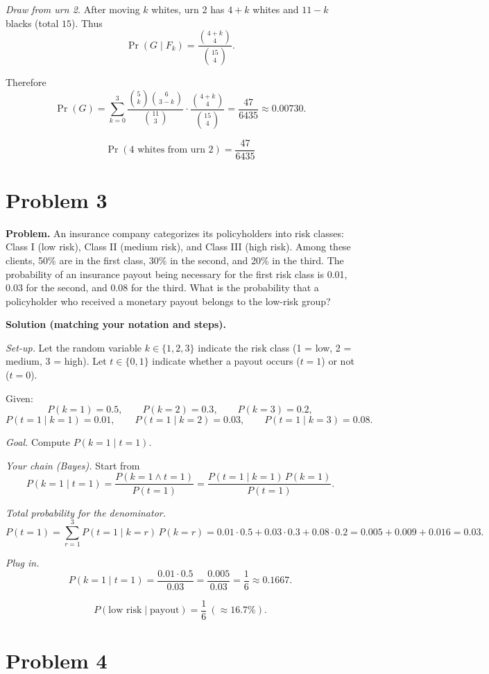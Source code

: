 \documentclass{article}
\begin{document}
\textit{Draw from urn 2.} After moving $k$ whites, urn 2 has $4+k$ whites and $11-k$ blacks
(total $15$). Thus
\[
\Pr(G\mid F_k)=\frac{\binom{4+k}{4}}{\binom{15}{4}}.
\]

Therefore
\[
\Pr(G)=\sum_{k=0}^{3}\frac{\binom{5}{k}\binom{6}{3-k}}{\binom{11}{3}}
\cdot \frac{\binom{4+k}{4}}{\binom{15}{4}}
= \frac{47}{6435}\approx 0.00730.
\]

\[
\boxed{\Pr(\text{4 whites from urn 2})=\dfrac{47}{6435}}
\]

\section{Problem 3}

\textbf{Problem.} An insurance company categorizes its policyholders into risk classes: Class I (low risk), Class II (medium risk), and Class III (high risk). Among these clients, 50\% are in the first class, 30\% in the second, and 20\% in the third. The probability of an insurance payout being necessary for the first risk class is 0.01, 0.03 for the second, and 0.08 for the third. What is the probability that a policyholder who received a monetary payout belongs to the low-risk group?

\textbf{Solution (matching your notation and steps).}

\textit{Set-up.} 
Let the random variable $k\in\{1,2,3\}$ indicate the risk class (1 = low, 2 = medium, 3 = high).
Let $t\in\{0,1\}$ indicate whether a payout occurs ($t=1$) or not ($t=0$).

Given:
\[
P(k=1)=0.5,\qquad P(k=2)=0.3,\qquad P(k=3)=0.2,
\]
\[
P(t=1\mid k=1)=0.01,\qquad P(t=1\mid k=2)=0.03,\qquad P(t=1\mid k=3)=0.08.
\]

\textit{Goal.} Compute $P(k=1\mid t=1)$.

\medskip
\textit{Your chain (Bayes).}
Start from
\[
P(k=1\mid t=1)=\frac{P(k=1\wedge t=1)}{P(t=1)}
=\frac{P(t=1\mid k=1)\,P(k=1)}{P(t=1)}.
\]

\textit{Total probability for the denominator.}
\[
P(t=1)=\sum_{r=1}^{3} P(t=1\mid k=r)\,P(k=r)
=0.01\cdot0.5+0.03\cdot0.3+0.08\cdot0.2
=0.005+0.009+0.016=0.03.
\]

\textit{Plug in.}
\[
P(k=1\mid t=1)
=\frac{0.01\cdot 0.5}{0.03}
=\frac{0.005}{0.03}
=\frac{1}{6}\approx 0.1667.
\]

\[
\boxed{P(\text{low risk}\mid \text{payout})=\dfrac{1}{6}\ (\approx 16.7\%).}
\]

\section{Problem 4}
\end{document}
